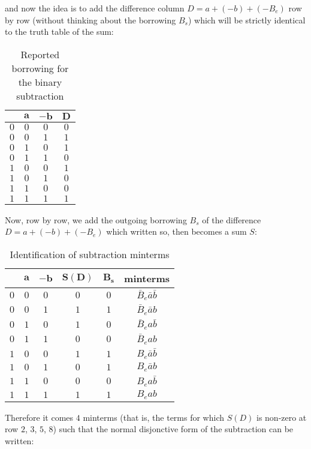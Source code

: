 	and now the idea is to add the difference column $D=a+(-b)+(-B_e)$ row by row (without thinking about the borrowing $B_s$) which will be strictly identical to the truth table of the sum:
	\begin{table}[H]
		\centering
		\begin{tabular}{|c|c|c|c|}
		\hline
		\rowcolor[HTML]{9B9B9B} 
		\multicolumn{1}{|l|}{\cellcolor[HTML]{9B9B9B}$\pmb{-B_e}$} & \multicolumn{1}{l|}{\cellcolor[HTML]{9B9B9B}$\pmb{a}$} & \multicolumn{1}{l|}{\cellcolor[HTML]{9B9B9B}$\pmb{-b}$} & \multicolumn{1}{l|}{\cellcolor[HTML]{9B9B9B}$\pmb{D}$} \\ \hline
		$0$ & $0$ & $0$ & $0$\\ \hline
		$0$ & $0$ & $1$ & $1$\\ \hline
		$0$ & $1$ & $0$ & $1$\\ \hline
		$0$ & $1$ & $1$ & $0$\\ \hline
		$1$ & $0$ & $0$ & $1$\\ \hline
		$1$ & $0$ & $1$ & $0$\\ \hline
		$1$ & $1$ & $0$ & $0$\\ \hline
		$1$ & $1$ & $1$ & $1$\\ \hline
		\end{tabular}
		\caption{Reported borrowing for the binary subtraction}
	\end{table}
	Now, row by row, we add the outgoing borrowing $B_s$ of the difference $D=a+(-b)+(-B_e)$ which written so, then becomes a sum $S$:
	\begin{table}[H]
		\centering
		\begin{tabular}{|c|c|c|c|c|c|}
		\hline
		\rowcolor[HTML]{9B9B9B} 
		\multicolumn{1}{|l|}{\cellcolor[HTML]{9B9B9B}$\pmb{-B_e}$} & \multicolumn{1}{l|}{\cellcolor[HTML]{9B9B9B}$\pmb{a}$} & \multicolumn{1}{l|}{\cellcolor[HTML]{9B9B9B}$\pmb{-b}$} & \multicolumn{1}{l|}{\cellcolor[HTML]{9B9B9B}$\pmb{S(D)}$} & \multicolumn{1}{l|}{\cellcolor[HTML]{9B9B9B}$\pmb{B_s}$} & \multicolumn{1}{l|}{\cellcolor[HTML]{9B9B9B}\textbf{minterms}} \\ \hline
		$0$ & $0$ & $0$ & $0$ & $0$ & $\bar{B}_e\bar{a}\bar{b}$\\ \hline
		$0$ & $0$ & $1$ & $1$ & $1$ & $\bar{B}_e\bar{a}b$\\ \hline
		$0$ & $1$ & $0$ & $1$ & $0$ & $\bar{B}_ea\bar{b}$\\ \hline
		$0$ & $1$ & $1$ & $0$ & $0$ & $\bar{B}_eab$\\ \hline
		$1$ & $0$ & $0$ & $1$ & $1$ & $B_e\bar{a}\bar{b}$\\ \hline
		$1$ & $0$ & $1$ & $0$ & $1$ & $B_e\bar{a}b$\\ \hline
		$1$ & $1$ & $0$ & $0$ & $0$ & $B_ea\bar{b}$\\ \hline
		$1$ & $1$ & $1$ & $1$ & $1$ & $B_eab$\\ \hline
		\end{tabular}
		\caption{Identification of subtraction minterms}
	\end{table}
	Therefore it comes $4$ minterms (that is, the terms for which $S(D)$ is non-zero at row $2$, $3$, $5$, $8$) such that the normal disjonctive form of the subtraction can be written:
	
